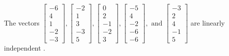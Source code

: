 \begin{exercise}
\begin{exerciseStatement}
  \end{exerciseStatement}
  \begin{exerciseAnswer}
   The vectors \(\left[\begin{array}{r}
-6 \\
4 \\
1 \\
-2 \\
-3
\end{array}\right] , \left[\begin{array}{r}
-2 \\
1 \\
3 \\
-3 \\
5
\end{array}\right] , \left[\begin{array}{r}
0 \\
2 \\
-1 \\
-2 \\
3
\end{array}\right] , \left[\begin{array}{r}
-5 \\
4 \\
-2 \\
-6 \\
-6
\end{array}\right] , \text{ and } \left[\begin{array}{r}
-3 \\
2 \\
4 \\
-1 \\
5
\end{array}\right]\) are 
  	 linearly independent  .
  


  \end{exerciseAnswer}
\end{exercise}